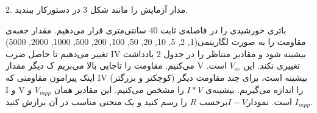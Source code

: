 \documentclass{article}
\begin{document}
	2. مدار آزمایش را مانند شکل 3 در دستورکار ببندید.
	
	باتری خورشیدی را در فاصله‌ی ثابت 40 سانتی‌متری قرار می‌دهیم. مقدار جعبه‌ی مقاومت را به صورت لگاریتمی(1, 2, 5, 10, 20, 50, 100, 200, 500, 1000, 2000, 5000) تغییر می‌دهیم تا حاصل ضرب IV بیشینه شود و مقادیر متناظر را در جدول 2 یادداشت می‌کنیم. مقاومت را تاجایی بالا می‌بریم ک دیگر مقدار V تغییری نکند. این $V_{oc}$ است. اینک پیرامون مقاومتی ‌که IV بیشینه است، برای چند مقاومت دیگر (کوچکتر و بزرگتر) I و V را اندازه می‌گیریم. بیشینه‌ی $I*V$ را مشخص می‌کنیم. این مقادیر همان $V_{mpp}$ و $I_{mpp}$ است. نمودار$I-V$برحسب $R$ را رسم کنید و یک منحنی مناسب در آن برازش کنید.
	
	

\begin{latin}
\vspace{1cm}
\begin{center}
\begin{table}[h!]
\centering

\setlength{\tabcolsep}{20pt}
\renewcommand{\arraystretch}{2}


\end{table}
\end{center}
\end{latin}
\end{document}

